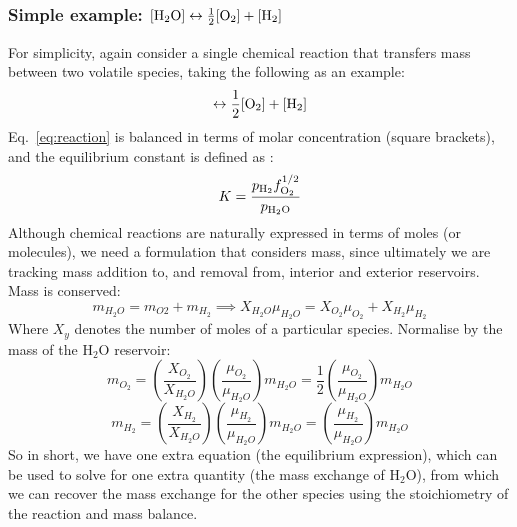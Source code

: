\subsubsection{Simple example: $[\rm{H}_2O]\leftrightarrow \frac{1}{2} [\rm{O}_2] + [\rm{H}_2]$}
For simplicity, again consider a single chemical reaction that transfers mass between two volatile species, taking the following as an example:
\begin{equation}
    [\rm{H}_2O]\leftrightarrow \frac{1}{2} [\rm{O}_2] + [\rm{H}_2]
    \label{eq:reaction}
\end{equation}
Eq.~\ref{eq:reaction} is balanced in terms of molar concentration (square brackets), and the equilibrium constant is defined as \cite[e.g.][]{SF17}:
\begin{equation}
K=\frac{p_{\rm H_2} f_{\rm O_2}^{1/2}}{p_{\rm H_2\rm O}}
\label{eq:SFequil}
\end{equation}
Although chemical reactions are naturally expressed in terms of moles (or molecules), we need a formulation that considers mass, since ultimately we are tracking mass addition to, and removal from, interior and exterior reservoirs.  Mass is conserved:
\begin{equation}
m_{H_2O} = m_{O2} + m_{H_2} \implies X_{H_2O} \mu_{H_2O} = X_{O_2} \mu_{O_2} + X_{H_2} \mu_{H_2}
\label{eq:reaction_mass}
\end{equation}
Where $X_y$ denotes the number of moles of a particular species.  Normalise by the mass of the H$_2$O reservoir:
\begin{equation}
m_{O_2} = \left( \frac{X_{O_2}}{X_{H_2O}} \right) \left(\frac{\mu_{O_2}}{\mu_{H_2O}}\right) m_{H_2O} = \frac{1}{2} \left(\frac{\mu_{O_2}}{\mu_{H_2O}}\right) m_{H_2O}
\end{equation}
\begin{equation}
m_{H_2} = \left( \frac{X_{H_2}}{X_{H_2O}} \right) \left(\frac{\mu_{H_2}}{\mu_{H_2O}}\right) m_{H_2O} = \left(\frac{\mu_{H_2}}{\mu_{H_2O}}\right) m_{H_2O}
\end{equation}
So in short, we have one extra equation (the equilibrium expression), which can be used to solve for one extra quantity (the mass exchange of H$_2$O), from which we can recover the mass exchange for the other species using the stoichiometry of the reaction and mass balance.
